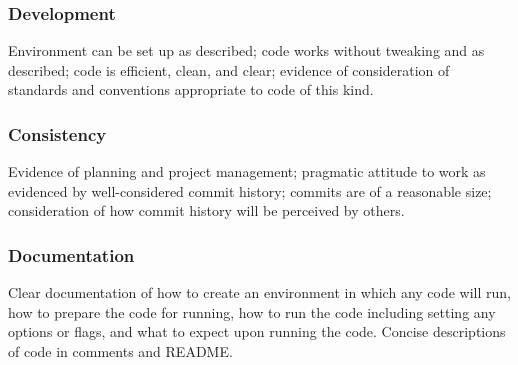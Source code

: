 \documentclass[a4paper, 12pt]{scrartcl}
\begin{document}
    \subsubsection*{Development}
    Environment can be set up as described; code works without tweaking and as described; code is efficient, clean, and clear; evidence of consideration of standards and conventions appropriate to code of this kind.
    \subsubsection*{Consistency}
    Evidence of planning and project management; pragmatic attitude to work as evidenced by well-considered commit history; commits are of a reasonable size; consideration of how commit history will be perceived by others.
    \subsubsection*{Documentation}
    Clear documentation of how to create an environment in which any code will run, how to prepare the code for running, how to run the code including setting any options or flags, and what to expect upon running the code. Concise descriptions of code in comments and README.
    
  
  
  
\end{document}
